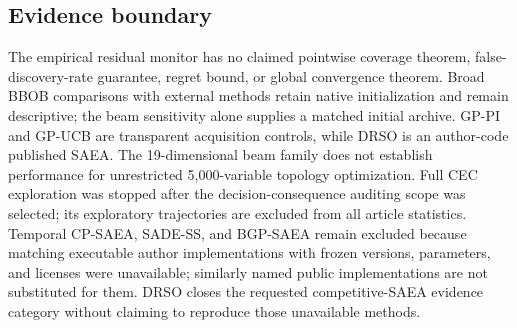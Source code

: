 \documentclass[cmc,article,submit,moreauthors,pdftex]{Definitions/tsp}
\begin{document}
\hypertarget{evidence-boundary}{%
\subsection{Evidence boundary}\label{evidence-boundary}}

The empirical residual monitor has no claimed pointwise coverage theorem, false-discovery-rate guarantee, regret bound, or global convergence theorem. Broad BBOB comparisons with external methods retain native initialization and remain descriptive; the beam sensitivity alone supplies a matched initial archive. GP-PI and GP-UCB are transparent acquisition controls, while DRSO is an author-code published SAEA. The 19-dimensional beam family does not establish performance for unrestricted 5,000-variable topology optimization. Full CEC exploration was stopped after the decision-consequence auditing scope was selected; its exploratory trajectories are excluded from all article statistics. Temporal CP-SAEA, SADE-SS, and BGP-SAEA remain excluded because matching executable author implementations with frozen versions, parameters, and licenses were unavailable; similarly named public implementations are not substituted for them. DRSO closes the requested competitive-SAEA evidence category without claiming to reproduce those unavailable methods.
\end{document}
